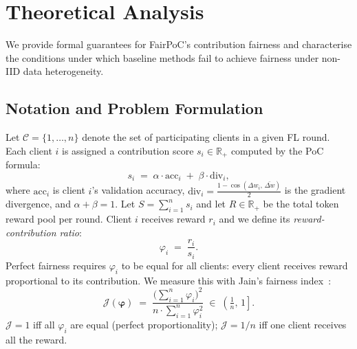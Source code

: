 
\section{Theoretical Analysis}
\label{sec:theory}

We provide formal guarantees for FairPoC's contribution fairness
and characterise the conditions under which baseline methods fail
to achieve fairness under non-IID data heterogeneity.

\subsection{Notation and Problem Formulation}

Let $\mathcal{C} = \{1, \ldots, n\}$ denote the set of participating
clients in a given FL round.
Each client $i$ is assigned a contribution score
$s_i \in \mathbb{R}_{+}$ computed by the PoC formula:
\begin{equation}
  s_i \;=\; \alpha \cdot \mathrm{acc}_i \;+\; \beta \cdot \mathrm{div}_i,
  \label{eq:poc_score}
\end{equation}
where $\mathrm{acc}_i$ is client $i$'s validation accuracy,
$\mathrm{div}_i = \tfrac{1 - \cos(\Delta w_i,\,\bar{\Delta w})}{2}$
is the gradient divergence, and $\alpha + \beta = 1$.
Let $S = \sum_{i=1}^{n} s_i$ and let $R \in \mathbb{R}_{+}$ be the
total token reward pool per round.
Client $i$ receives reward $r_i$ and we define its
\emph{reward-contribution ratio}:
\begin{equation}
  \varphi_i \;=\; \frac{r_i}{s_i}.
\end{equation}
Perfect fairness requires $\varphi_i$ to be equal for all clients:
every client receives reward proportional to its contribution.
We measure this with Jain's fairness index~\cite{jain1984}:
\begin{equation}
  \mathcal{J}(\boldsymbol{\varphi})
  \;=\;
  \frac{\bigl(\sum_{i=1}^{n} \varphi_i\bigr)^2}
       {n \cdot \sum_{i=1}^{n} \varphi_i^2}
  \;\in\; \left(\tfrac{1}{n},\, 1\right].
\end{equation}
$\mathcal{J} = 1$ iff all $\varphi_i$ are equal (perfect proportionality);
$\mathcal{J} = 1/n$ iff one client receives all the reward.

